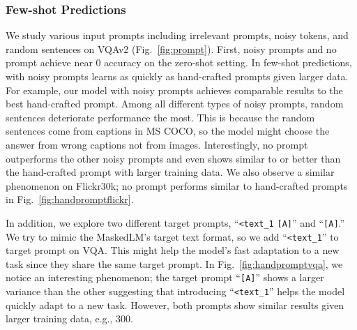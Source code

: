 \subsubsection{Few-shot Predictions}
We study various input prompts including irrelevant prompts, noisy tokens, and random sentences on VQAv2 (Fig.~\ref{fig:prompt}).
First, noisy prompts and no prompt achieve near 0 accuracy on the zero-shot setting.
In few-shot predictions, \method\xspace with noisy prompts learns as quickly as hand-crafted prompts given larger data.
For example, our model with noisy prompts achieves comparable results to the best hand-crafted prompt.
Among all different types of noisy prompts, random sentences deteriorate performance the most.
This is because the random sentences come from captions in MS COCO, so the model might choose the answer from wrong captions not from images.
Interestingly, no prompt outperforms the other noisy prompts and even shows similar to or better than the hand-crafted prompt with larger training data.
We also observe a similar phenomenon on Flickr30k; no prompt performs similar to hand-crafted prompts in Fig.~\ref{fig:handpromptflickr}.

In addition, we explore two different target prompts, ``\texttt{<text\_1} \texttt{[A]}'' and ``\texttt{[A]}.''
We try to mimic the MaskedLM's target text format, so we add ``\texttt{<text\_1}'' to target prompt on VQA.
This might help the model's fast adaptation to a new task since they share the same target prompt.
In Fig.~\ref{fig:handpromptvqa}, we notice an interesting phenomenon; the target prompt ``\texttt{[A]}'' shows a larger variance than the other suggesting that introducing ``\texttt{<text\_1}'' helps the model quickly adapt to a new task.
However, both prompts show similar results given larger training data, e.g., 300.








































